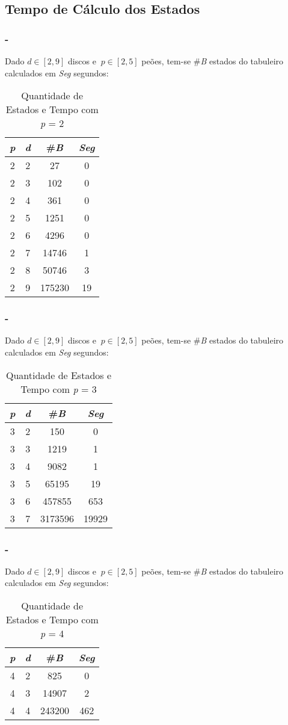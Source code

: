 \subsection{Tempo de Cálculo dos Estados}
\begin{frame}
\frametitle{\secname - \subsecname}
Dado $d\!\in\![2,9]$ discos e $\ p\!\in\![2,5]$ peões, tem-se \#\emph{B} estados do tabuleiro calculados em \emph{Seg} segundos:

\begin{table}[ht]
\centering
\begin{tabular}{|c|c|c|c|}
\hline
\emph{p} & \emph{d} & \#\emph{B} & \emph{Seg}\tabularnewline
\hline
\hline
2 & 2 & 27 & 0\tabularnewline
\hline
2 & 3 & 102 & 0\tabularnewline
\hline
2 & 4 & 361 & 0\tabularnewline
\hline
2 & 5 & 1251 & 0\tabularnewline
\hline
2 & 6 & 4296 & 0\tabularnewline
\hline
2 & 7 & 14746 & 1\tabularnewline
\hline
2 & 8 & 50746 & 3\tabularnewline
\hline
2 & 9 & 175230 & 19\tabularnewline
\hline
\end{tabular}
\caption{Quantidade de Estados e Tempo com \emph{p} = 2}
\label{tab:quantidade-de-estados-e-tempo-com-p-2}
\end{table}
\end{frame}
\begin{frame}
\frametitle{\secname - \subsecname}
Dado $d\!\in\![2,9]$ discos e $\ p\!\in\![2,5]$ peões, tem-se \#\emph{B} estados do tabuleiro calculados em \emph{Seg} segundos:

\begin{table}[ht]
\centering
\begin{tabular}{|c|c|c|c|}
\hline
\emph{p} & \emph{d} & \#\emph{B} & \emph{Seg}\tabularnewline
\hline
\hline
3 & 2 & 150 & 0\tabularnewline
\hline
3 & 3 & 1219 & 1\tabularnewline
\hline
3 & 4 & 9082 & 1\tabularnewline
\hline
3 & 5 & 65195 & 19\tabularnewline
\hline
3 & 6 & 457855 & 653\tabularnewline
\hline
3 & 7 & 3173596 & 19929\tabularnewline
\hline
\end{tabular}
\caption{Quantidade de Estados e Tempo com \emph{p} = 3}
\label{tab:quantidade-de-estados-e-tempo-com-p-3}
\end{table}
\end{frame}
\begin{frame}
\frametitle{\secname - \subsecname}
Dado $d\!\in\![2,9]$ discos e $\ p\!\in\![2,5]$ peões, tem-se \#\emph{B} estados do tabuleiro calculados em \emph{Seg} segundos:

\begin{table}[ht]
\centering
\begin{tabular}{|c|c|c|c|}
\hline
\emph{p} & \emph{d} & \#\emph{B} & \emph{Seg}\tabularnewline
\hline
\hline
4 & 2 & 825 & 0\tabularnewline
\hline
4 & 3 & 14907 & 2\tabularnewline
\hline
4 & 4 & 243200 & 462\tabularnewline
\hline
\end{tabular}
\caption{Quantidade de Estados e Tempo com \emph{p} = 4}
\label{tab:quantidade-de-estados-e-tempo-com-p-4}
\end{table}
\end{frame}
